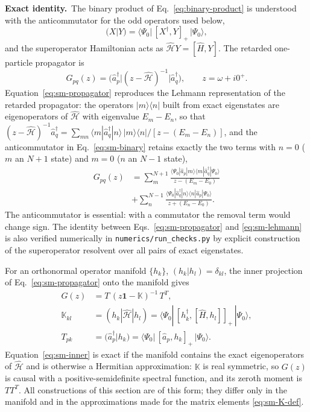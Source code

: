 \documentclass[aip,jcp,reprint,noshowkeys,superscriptaddress]{revtex4-1}
\newcommand{\Exact}{\textbf{Exact identity.}\ }
\begin{document}
\Exact The binary product of Eq.~\eqref{eq:binary-product} is understood
with the anticommutator for the odd operators used below,
\begin{equation}
  (X|Y)=\langle\Psi_0|\,[X^\dagger,Y]_+\,|\Psi_0\rangle ,
  \label{eq:sm-binary}
\end{equation}
and the superoperator Hamiltonian acts as $\hat{\mathcal H}Y=[\hat H,Y]$.
The retarded one-particle propagator is
\begin{equation}
  G_{pq}(z)=\bigl(\hat a_p^\dagger\big|(z-\hat{\mathcal H})^{-1}\big|\hat a_q^\dagger\bigr),
  \qquad z=\omega+i0^+ .
  \label{eq:sm-propagator}
\end{equation}
Equation~\eqref{eq:sm-propagator} reproduces the Lehmann representation of
the retarded propagator: the operators $|m\rangle\langle n|$ built from
exact eigenstates are eigenoperators of $\hat{\mathcal H}$ with eigenvalue
$E_m-E_n$, so that
$(z-\hat{\mathcal H})^{-1}\hat a_q^\dagger=\sum_{mn}\langle m|\hat a_q^\dagger|n\rangle\,|m\rangle\langle n|/[z-(E_m-E_n)]$,
and the anticommutator in Eq.~\eqref{eq:sm-binary} retains exactly the two
terms with $n=0$ ($m$ an $N+1$ state) and $m=0$ ($n$ an $N-1$ state),
\begin{align}
  G_{pq}(z)&=\sum_{m}^{N+1}\frac{\langle\Psi_0|\hat a_p|m\rangle\langle m|\hat a_q^\dagger|\Psi_0\rangle}{z-(E_m-E_0)}
  \nonumber\\
  &+\sum_{n}^{N-1}\frac{\langle\Psi_0|\hat a_q^\dagger|n\rangle\langle n|\hat a_p|\Psi_0\rangle}{z+(E_n-E_0)} .
  \label{eq:sm-lehmann}
\end{align}
The anticommutator is essential: with a commutator the removal term would
change sign.  The identity between Eqs.~\eqref{eq:sm-propagator} and
\eqref{eq:sm-lehmann} is also verified numerically in
\texttt{numerics/run\_checks.py} by explicit construction of the
superoperator resolvent over all pairs of exact eigenstates.

For an orthonormal operator manifold $\{h_k\}$, $(h_k|h_l)=\delta_{kl}$,
the inner projection of Eq.~\eqref{eq:sm-propagator} onto the manifold
gives
\begin{align}
  G(z)&=T\,(z\mathbf 1-\mathbb K)^{-1}\,T^{T},
  \label{eq:sm-inner}\\
  \mathbb K_{kl}&=(h_k|\hat{\mathcal H}|h_l)
  =\langle\Psi_0|\,[h_k^\dagger,[\hat H,h_l]]_+\,|\Psi_0\rangle ,
  \label{eq:sm-K-def}\\
  T_{pk}&=(\hat a_p^\dagger|h_k)=\langle\Psi_0|\,[\hat a_p,h_k]_+\,|\Psi_0\rangle .
  \label{eq:sm-T-def}
\end{align}
Equation~\eqref{eq:sm-inner} is exact if the manifold contains the exact
eigenoperators of $\hat{\mathcal H}$ and is otherwise a Hermitian
approximation: $\mathbb K$ is real symmetric, so $G(z)$ is causal with a
positive-semidefinite spectral function, and its zeroth moment is $TT^{T}$.
All constructions of this section are of this form; they differ only in
the manifold and in the approximations made for the matrix elements
\eqref{eq:sm-K-def}.
\end{document}
